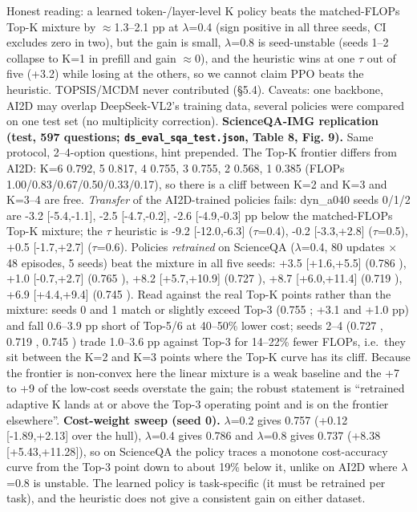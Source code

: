 Honest reading: a learned token-/layer-level K policy beats the matched-FLOPs Top-K mixture by $\approx$1.3--2.1 pp at $\lambda$=0.4 (sign positive in all three seeds, CI excludes zero in two), but the gain is small, $\lambda$=0.8 is seed-unstable (seeds 1--2 collapse to K=1 in prefill and gain $\approx$0), and the heuristic wins at one $\tau$ out of five (+3.2) while losing at the others, so we cannot claim PPO beats the heuristic. TOPSIS/MCDM never contributed (§5.4). Caveats: one backbone, AI2D may overlap DeepSeek-VL2's training data, several policies were compared on one test set (no multiplicity correction).
\textbf{ScienceQA-IMG replication (test, 597 questions; \texttt{ds\_eval\_sqa\_test.json}, Table 8, Fig. 9).} Same protocol, 2--4-option questions, hint prepended. The Top-K frontier differs from AI2D: K=6 0.792, 5 0.817, 4 0.755, 3 0.755, 2 0.568, 1 0.385 (FLOPs 1.00/0.83/0.67/0.50/0.33/0.17), so there is a cliff between K=2 and K=3 and K=3--4 are free. \emph{Transfer} of the AI2D-trained policies fails: dyn\_a040 seeds 0/1/2 are -3.2 {[}-5.4,-1.1{]}, -2.5 {[}-4.7,-0.2{]}, -2.6 {[}-4.9,-0.3{]} pp below the matched-FLOPs Top-K mixture; the $\tau$ heuristic is -9.2 {[}-12.0,-6.3{]} ($\tau$=0.4), -0.2 {[}-3.3,+2.8{]} ($\tau$=0.5), +0.5 {[}-1.7,+2.7{]} ($\tau$=0.6). Policies \emph{retrained} on ScienceQA ($\lambda$=0.4, 80 updates $\times$ 48 episodes, 5 seeds) beat the mixture in all five seeds: +3.5 {[}+1.6,+5.5{]} (0.786 \citet{0.495}), +1.0 {[}-0.7,+2.7{]} (0.765 \citet{0.502}), +8.2 {[}+5.7,+10.9{]} (0.727 \citet{0.401}), +8.7 {[}+6.0,+11.4{]} (0.719 \citet{0.390}), +6.9 {[}+4.4,+9.4{]} (0.745 \citet{0.430}). Read against the real Top-K points rather than the mixture: seeds 0 and 1 match or slightly exceed Top-3 (0.755 \citet{0.500}; +3.1 and +1.0 pp) and fall 0.6--3.9 pp short of Top-5/6 at 40--50\% lower cost; seeds 2--4 (0.727 \citet{0.401}, 0.719 \citet{0.390}, 0.745 \citet{0.430}) trade 1.0--3.6 pp against Top-3 for 14--22\% fewer FLOPs, i.e.~they sit between the K=2 and K=3 points where the Top-K curve has its cliff. Because the frontier is non-convex here the linear mixture is a weak baseline and the +7 to +9 of the low-cost seeds overstate the gain; the robust statement is ``retrained adaptive K lands at or above the Top-3 operating point and is on the frontier elsewhere''. \textbf{Cost-weight sweep (seed 0).} $\lambda$=0.2 gives 0.757 \citet{0.502} (+0.12 {[}-1.89,+2.13{]} over the hull), $\lambda$=0.4 gives 0.786 \citet{0.495} and $\lambda$=0.8 gives 0.737 \citet{0.406} (+8.38 {[}+5.43,+11.28{]}), so on ScienceQA the policy traces a monotone cost-accuracy curve from the Top-3 point down to about 19\% below it, unlike on AI2D where $\lambda$=0.8 is unstable. The learned policy is task-specific (it must be retrained per task), and the heuristic does not give a consistent gain on either dataset.

